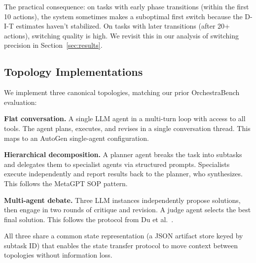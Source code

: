 The practical consequence: on tasks with early phase transitions (within
the first 10 actions), the system sometimes makes a suboptimal first
switch because the D-I-T estimates haven't stabilized. On tasks with
later transitions (after 20+ actions), switching quality is high. We
revisit this in our analysis of switching precision in
Section~\ref{sec:results}.

\subsection{Topology Implementations}\label{topology-implementations}

We implement three canonical topologies, matching our prior
OrchestraBench evaluation:

\textbf{Flat conversation.} A single LLM agent in a multi-turn loop with
access to all tools. The agent plans, executes, and revises in a single
conversation thread. This maps to an AutoGen \citep{wu_2023}
single-agent configuration.

\textbf{Hierarchical decomposition.} A planner agent breaks the task
into subtasks and delegates them to specialist agents via structured
prompts. Specialists execute independently and report results back to
the planner, who synthesizes. This follows the MetaGPT \citep{hong_2023}
SOP pattern.

\textbf{Multi-agent debate.} Three LLM instances independently propose
solutions, then engage in two rounds of critique and revision. A judge
agent selects the best final solution. This follows the protocol from Du
et al.~\citep{du_2023}.

All three share a common state representation (a JSON artifact store
keyed by subtask ID) that enables the state transfer protocol to move
context between topologies without information loss.

